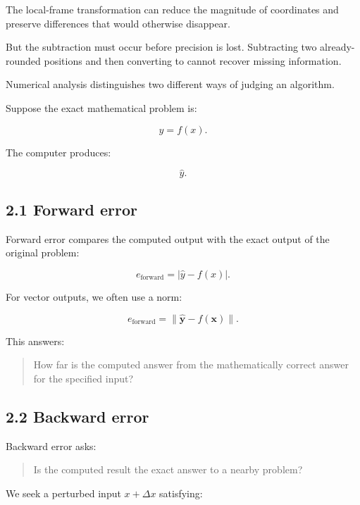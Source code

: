 The local-frame transformation can reduce the magnitude of coordinates and preserve differences that would otherwise disappear.

But the subtraction must occur before precision is lost. Subtracting two already-rounded  positions and then converting to  cannot recover missing information.

Numerical analysis distinguishes two different ways of judging an algorithm.

Suppose the exact mathematical problem is:

\[ y=f(x). \]

The computer produces:

\[ \hat y. \]

\subsection{2.1 Forward error}\label{02-foundations-ii-ch028-forward-error}

\hypertarget{02-foundations-ii-ch028-forward-error}{}

Forward error compares the computed output with the exact output of the original problem:

\[ \boxed{ e_{\mathrm{forward}}= |\hat y-f(x)| }. \]

For vector outputs, we often use a norm:

\[ \boxed{ e_{\mathrm{forward}} = \|\hat{\mathbf y}-f(\mathbf x)\| }. \]

This answers:

\begin{quote}
How far is the computed answer from the mathematically correct answer for the specified input?
\end{quote}

\subsection{2.2 Backward error}\label{02-foundations-ii-ch028-backward-error}

\hypertarget{02-foundations-ii-ch028-backward-error}{}

Backward error asks:

\begin{quote}
Is the computed result the exact answer to a nearby problem?
\end{quote}

We seek a perturbed input \(x+\Delta x\) satisfying:

